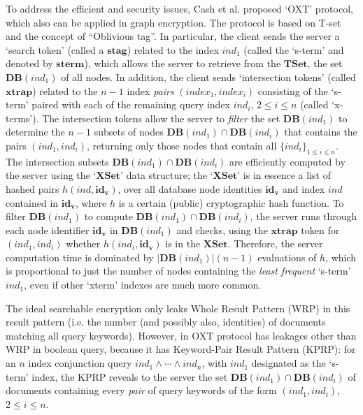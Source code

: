 To address the efficient and security issues, Cash et al. proposed `OXT' protocol, which also can be applied in graph encryption. The protocol is based on T-set and the concept of ``Oblivious tag''. 
In particular, the client sends the server a `search token' (called a $\mathbf{stag}$) related to the index $ind_1$ (called the `s-term' and denoted by $\mathbf{sterm}$), which allows the server to retrieve from the $\mathbf{TSet}$, the set $\mathbf{DB}(ind_1)$ of all nodes. In addition, the client sends `intersection tokens' (called $\mathbf{xtrap}$) related to the $n-1$ index \emph{pairs} $(index_1,index_i)$ consisting of the `s-term' paired with each of the remaining query index $ind_i$, $2\leq i \leq n$ (called `x-terms'). 
The intersection tokens allow the server to \emph{filter} the set $\mathbf{DB}(ind_1)$ to determine the $n-1$ subsets of nodes $\mathbf{DB}(ind_1) \cap \mathbf{DB}(ind_i)$ that contains the pairs $(ind_1, ind_i)$, returning only those nodes that contain all $\{ind_i\}_{1\leq i\leq n}$. 
The intersection subsets $\mathbf{DB}(ind_1) \cap \mathbf{DB}(ind_i)$ are efficiently computed by the server using the `$\mathbf{XSet}$' data structure; the `$\mathbf{XSet}$' is in essence a list of hashed pairs $h(ind, \mathbf{id_v})$, over all database node identities $\mathbf{id_v}$ and index $ind$ contained in $\mathbf{id_v}$, where $h$ is a certain (public) cryptographic hash function. 
To filter $\mathbf{DB}(ind_1) $ to compute $\mathbf{DB}(ind_1)  \cap  \mathbf{DB}(ind_i)$, the server runs through each node identifier $\mathbf{id_v}$ in $ \mathbf{DB}(ind_1)$ and checks, using the $\mathbf{xtrap}$ token for $(ind_1, ind_i)$ whether $h(ind_i, \mathbf{id_v})$ is in the $\mathbf{XSet}$. 
Therefore, the server computation time is dominated by $|\mathbf{DB}(ind_1)|(n-1)$ evaluations of $h$, which is proportional to just the number of nodes
containing the \emph{least frequent} `s-term' $ind_1$, even if other `xterm' indexes are much more common. 

The ideal searchable encryption only leaks Whole Result Pattern (WRP) in this result pattern (i.e. the number (and possibly also, identities) of documents matching all query keywords). However, in OXT protocol has leakages other than WRP in boolean query, because it has Keyword-Pair Result Pattern (KPRP): for an $n$ index conjunction query $ind_1 \wedge \cdots \wedge ind_n$, with $ind_1$ designated as the `s-term' index, the KPRP reveals to the server the set $\mathbf{DB}(ind_1) \cap \mathbf{DB}(ind_i)$ of documents containing every \emph{pair} of query keywords of the form $(ind_1, ind_i)$, $2\leq i\leq n$.

